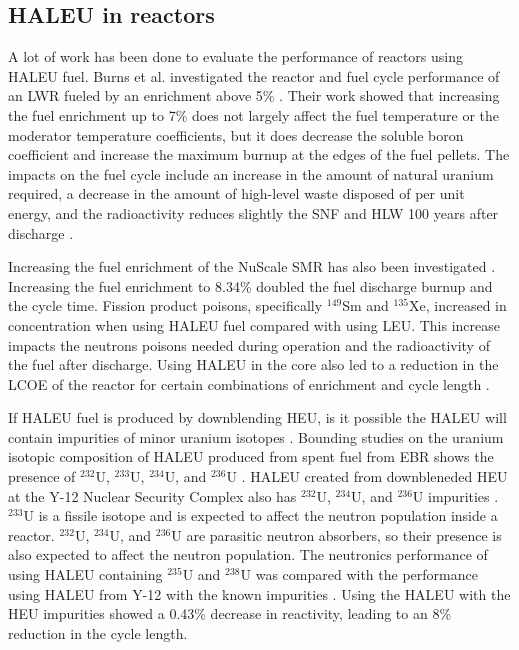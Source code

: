 \subsection{HALEU in reactors}
A lot of work has been done to evaluate the performance of reactors 
using \gls{HALEU} fuel. Burns et al. investigated the reactor and fuel cycle 
performance of an \gls{LWR} fueled by an enrichment above 5\% \cite{burns_reactor_2020}.
Their work showed that increasing the fuel enrichment up to 7\% does not 
largely affect the fuel temperature or the moderator temperature coefficients,
but it does decrease the soluble boron coefficient and increase the maximum 
burnup at the edges of the fuel pellets. The impacts on the fuel cycle include 
an increase in the amount of natural uranium required, a decrease in the 
amount of high-level waste disposed of per unit energy, and the 
radioactivity reduces slightly the \gls{SNF} and \gls{HLW} 100 years after 
discharge \cite{burns_reactor_2020}.

Increasing the fuel enrichment of the NuScale \gls{SMR} has also been 
investigated \cite{carlson_implications_2022}. Increasing the fuel 
enrichment to 8.34\% doubled the fuel discharge burnup and the cycle time. 
Fission product poisons, specifically $^{149}$Sm and $^{135}$Xe, increased 
in concentration when using \gls{HALEU} fuel compared with using \gls{LEU}. 
This increase impacts the 
neutrons poisons needed during operation and the radioactivity of 
the fuel after discharge. Using \gls{HALEU} in the core also led to a 
reduction in the \gls{LCOE} of the reactor for certain combinations of 
enrichment and cycle length \cite{carlson_economic_2020,carlson_implications_2022}.

If \gls{HALEU} fuel is produced by downblending \gls{HEU}, is it possible 
the \gls{HALEU} will contain impurities of minor uranium 
isotopes \cite{noauthor_establishing_2022}. Bounding studies on the 
uranium 
isotopic composition of \gls{HALEU} produced from spent fuel from \gls{EBR} 
shows the presence of $^{232}$U, $^{233}$U, $^{234}$U, and $^{236}$U
\cite{vaden_isotopic_2018}. 
\gls{HALEU} created from downbleneded \gls{HEU} at the Y-12 Nuclear Security 
Complex also has $^{232}$U, $^{234}$U, and $^{236}$U impurities
\cite{nelson_foreign_2010}. $^{233}$U is a fissile 
isotope and is expected to affect the neutron population inside a reactor.
$^{232}$U, $^{234}$U, and $^{236}$U are parasitic neutron absorbers, so 
their 
presence is also expected to affect the neutron population. The neutronics 
performance of using \gls{HALEU} containing $^{235}$U and $^{238}$U 
was compared 
with the performance using \gls{HALEU} from Y-12 with the known impurities 
\cite{celikten_effects_2021}. Using the \gls{HALEU} with the \gls{HEU} 
impurities showed a 0.43\% decrease in reactivity, leading to an 8\% reduction 
in the cycle length. 